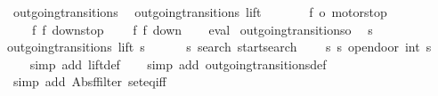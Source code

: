 \begin{isabellebody}
\isanewline
{}\isamarkupfalse%
\ outgoing{\isacharunderscore}transitions{\isacharunderscore}{}{\isacharcolon}\isanewline
\ \ {\isachardoublequoteopen}outgoing{\isacharunderscore}transitions\ lift\ {}\ {\isacharequal}\ {\isacharbraceleft}{\isacharbar}\isanewline
\ \ \ \ {\isacharparenleft}{\isacharparenleft}f{}{\isacharcomma}\ o{}{\isacharparenright}{\isacharcomma}\ motorstop{}{\isacharparenright}{\isacharcomma}\isanewline
\ \ \ \ {\isacharparenleft}{\isacharparenleft}f{}{\isacharcomma}\ f{}{\isacharparenright}{\isacharcomma}\ down{}{}stop{\isacharparenright}{\isacharcomma}\isanewline
\ \ \ \ {\isacharparenleft}{\isacharparenleft}f{}{\isacharcomma}\ f{}{\isacharparenright}{\isacharcomma}\ down{}{}{\isacharparenright}\isanewline
{\isacharbar}{\isacharbraceright}{\isachardoublequoteclose}\isanewline
%
\isadelimproof
\ \ %
\endisadelimproof
%
\isatagproof
{}\isamarkupfalse%
\ eval%
\endisatagproof
{\isafoldproof}%
%
\isadelimproof
\isanewline
%
\endisadelimproof
\isanewline
{}\isamarkupfalse%
\ outgoing{\isacharunderscore}transitions{\isacharunderscore}o{\isacharcolon}\isanewline
\ \ {\isachardoublequoteopen}s\ {\isasymin}\ {\isacharbraceleft}{}{\isacharcomma}\ {}{\isacharcomma}\ {}{\isacharcomma}\ {}{\isacharbraceright}\ {\isasymLongrightarrow}\isanewline
outgoing{\isacharunderscore}transitions\ lift\ s\ {\isacharequal}\ {\isacharbraceleft}{\isacharbar}\isanewline
\ \ \ \ {\isacharparenleft}{\isacharparenleft}s{\isacharcomma}\ search{\isacharparenright}{\isacharcomma}\ startsearch{\isacharparenright}{\isacharcomma}\isanewline
\ \ \ \ {\isacharparenleft}{\isacharparenleft}s{\isacharcomma}\ s{\isacharparenright}{\isacharcomma}\ opendoor\ {\isacharparenleft}int\ s\ {\isacharminus}\ {}{\isacharparenright}{\isacharparenright}\isanewline
{\isacharbar}{\isacharbraceright}{\isachardoublequoteclose}\isanewline
%
\isadelimproof
\isanewline
\ \ %
\endisadelimproof
%
\isatagproof
{}\isamarkupfalse%
\ {\isacharparenleft}simp\ add{\isacharcolon}\ lift{\isacharunderscore}def{\isacharparenright}\isanewline
\isanewline
\ \ \isamarkupfalse%
\ {\isacharparenleft}simp\ add{\isacharcolon}\ outgoing{\isacharunderscore}transitions{\isacharunderscore}def{\isacharparenright}\isanewline
\ \ \isamarkupfalse%
\ {\isacharparenleft}simp\ add{\isacharcolon}\ Abs{\isacharunderscore}ffilter\ set{\isacharunderscore}eq{\isacharunderscore}iff{\isacharparenright}\isanewline

\end{isabellebody}
